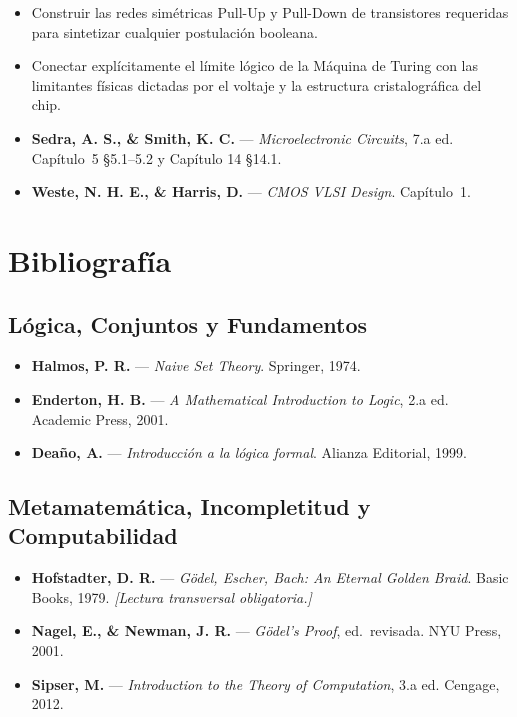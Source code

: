\documentclass[11pt, letterpaper]{article}
\begin{document}
\begin{objetivos}
\begin{itemize}
  \item Construir las redes sim\'etricas Pull-Up y Pull-Down de transistores requeridas para sintetizar cualquier postulaci\'on booleana.
  \item Conectar expl\'icitamente el l\'imite l\'ogico de la M\'aquina de Turing con las limitantes f\'isicas dictadas por el voltaje y la estructura cristalogr\'afica del chip.
\end{itemize}
\end{objetivos}

\begin{lecturas}
\begin{itemize}
  \item[$(\star)$] \textbf{Sedra, A. S., \& Smith, K. C.} --- \emph{Microelectronic Circuits}, 7.a ed. Cap\'itulo~5 \S5.1--5.2 y Cap\'itulo 14 \S14.1.
  \item \textbf{Weste, N. H. E., \& Harris, D.} --- \emph{CMOS VLSI Design}. Cap\'itulo~1.
\end{itemize}
\end{lecturas}

\newpage

\section{Bibliografía}

\subsection*{L\'ogica, Conjuntos y Fundamentos}
\begin{itemize}
  \item \textbf{Halmos, P. R.} --- \emph{Naive Set Theory}. Springer, 1974.
  \item \textbf{Enderton, H. B.} --- \emph{A Mathematical Introduction to Logic}, 2.a ed. Academic Press, 2001.
  \item \textbf{Deaño, A.} --- \emph{Introducci\'on a la l\'ogica formal}. Alianza Editorial, 1999.
\end{itemize}

\subsection*{Metamatem\'atica, Incompletitud y Computabilidad}
\begin{itemize}
	
  \item \textbf{Hofstadter, D. R.} --- \emph{G\"odel, Escher, Bach: An Eternal Golden Braid}. Basic Books, 1979. \textit{[Lectura transversal obligatoria.]}
  \item \textbf{Nagel, E., \& Newman, J. R.} --- \emph{G\"odel's Proof}, ed.\ revisada. NYU Press, 2001.
  \item \textbf{Sipser, M.} --- \emph{Introduction to the Theory of Computation}, 3.a ed. Cengage, 2012.
\end{itemize}
\end{document}
